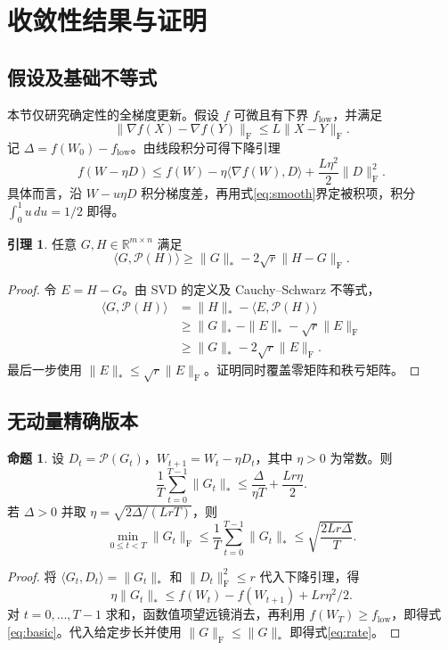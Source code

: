 \documentclass[11pt,a4paper]{article}
\theoremstyle{definition}
\newtheorem{theorem}{命题}
\newtheorem{lemma}{引理}
\newcommand{\F}{\mathrm{F}}
\newcommand{\Pol}{\mathcal{P}}
\begin{document}
\section{收敛性结果与证明}
\subsection{假设及基础不等式}
本节仅研究确定性的全梯度更新。假设 $f$ 可微且有下界 $f_{\mathrm{low}}$，并满足
\begin{equation}
\|\nabla f(X)-\nabla f(Y)\|_\F\le L\|X-Y\|_\F.
\label{eq:smooth}
\end{equation}
记 $\Delta=f(W_0)-f_{\mathrm{low}}$。由线段积分可得下降引理
\begin{equation}
 f(W-\eta D)\le f(W)-\eta\langle\nabla f(W),D\rangle
                  +\frac{L\eta^2}{2}\|D\|_\F^2.
\label{eq:descent}
\end{equation}
具体而言，沿 $W-u\eta D$ 积分梯度差，再用式\eqref{eq:smooth}界定被积项，积分 $\int_0^1u\,du=1/2$ 即得。

\begin{lemma}
任意 $G,H\in\mathbb R^{m\times n}$ 满足
\begin{equation}
 \langle G,\Pol(H)\rangle
 \ge \|G\|_*-2\sqrt r\|H-G\|_\F.
 \label{eq:polar-error}
\end{equation}
\end{lemma}
\begin{proof}
令 $E=H-G$。由 SVD 的定义及 Cauchy--Schwarz 不等式，
\begin{align*}
\langle G,\Pol(H)\rangle
 &=\|H\|_*-\langle E,\Pol(H)\rangle\\
 &\ge\|G\|_*-\|E\|_*-\sqrt r\|E\|_\F\\
 &\ge\|G\|_*-2\sqrt r\|E\|_\F.
\end{align*}
最后一步使用 $\|E\|_*\le\sqrt r\|E\|_\F$。证明同时覆盖零矩阵和秩亏矩阵。
\end{proof}

\subsection{无动量精确版本}
\begin{theorem}
设 $D_t=\Pol(G_t)$，$W_{t+1}=W_t-\eta D_t$，其中 $\eta>0$ 为常数。则
\begin{equation}
 \frac1T\sum_{t=0}^{T-1}\|G_t\|_*
 \le\frac{\Delta}{\eta T}+\frac{Lr\eta}{2}.
 \label{eq:basic}
\end{equation}
若 $\Delta>0$ 并取 $\eta=\sqrt{2\Delta/(LrT)}$，则
\begin{equation}
 \min_{0\le t<T}\|G_t\|_\F
 \le\frac1T\sum_{t=0}^{T-1}\|G_t\|_*
 \le\sqrt{\frac{2Lr\Delta}{T}}.
 \label{eq:rate}
\end{equation}
\end{theorem}
\begin{proof}
将 $\langle G_t,D_t\rangle=\|G_t\|_*$ 和 $\|D_t\|_\F^2\le r$ 代入下降引理，得
\[
 \eta\|G_t\|_*\le f(W_t)-f(W_{t+1})+Lr\eta^2/2.
\]
对 $t=0,\ldots,T-1$ 求和，函数值项望远镜消去，再利用 $f(W_T)\ge f_{\mathrm{low}}$，即得式\eqref{eq:basic}。代入给定步长并使用 $\|G\|_\F\le\|G\|_*$ 即得式\eqref{eq:rate}。
\end{proof}
\end{document}
